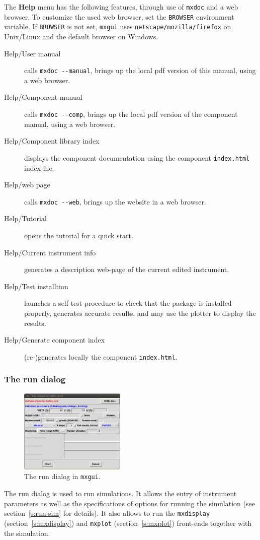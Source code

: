 \noindent The {\bfseries Help} menu has the following features, through use of
\verb+mxdoc+ and a web browser. To customize the used web browser, set
the \verb+BROWSER+ environment variable. If \verb+BROWSER+ is not set,
\verb+mxgui+ uses \verb+netscape/mozilla/firefox+ on Unix/Linux and the default browser on
Windows.
\begin{description}
\item[Help/\MCX User manual] calls \verb+mxdoc --manual+, brings up the local
  pdf version of this manual, using a web browser.
\item[Help/\MCX Component manual] calls \verb+mxdoc --comp+, brings up the local
  pdf version of the component manual, using a web browser.
\item[Help/Component library index] displays the component documentation using
  the component \verb+index.html+ index file.
\item[Help/\MCX web page] calls \verb+mxdoc --web+, brings up the \MCX
  website in a web browser.
\item[Help/Tutorial] opens the \MCX tutorial for a quick start.
\item[Help/Current instrument info] generates a description web-page of the current edited instrument.
\item[Help/Test \MCX installtion] launches a self test procedure to check that the \MCX package is installed properly, generates accurate results, and may use the plotter to display the results.
\item[Help/Generate component index] (re-)generates locally the component \verb+index.html+.
\end{description}


\subsubsection{The run dialog}

\begin{figure}[htb!]
  \begin{center}
    \includegraphics[width=0.45\textwidth]{figures/mxgui-run.eps}
  \end{center}
\caption{The run dialog in \texttt{mxgui}.}
\label{fig:mxgui-run}
\end{figure}
%
The run dialog is used to run simulations. It allows the entry of
instrument parameters as well as the specifications of options for
running the simulation (see section~\ref{s:run-sim} for details). It
also allows to run the \verb+mxdisplay+ (section~\ref{s:mxdisplay}) and
\verb+mxplot+ (section~\ref{s:mxplot}) front-ends together with the
simulation.

